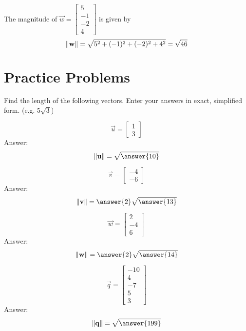 \documentclass{ximera}
\begin{document}
\begin{example}\label{ex:findnorminr4}
The magnitude of $\vec{w}=\begin{bmatrix}5\\ -1\\ -2\\ 4\end{bmatrix}$ is given by
 $$\left\lVert\mathbf{w}\right\rVert=\sqrt{5^2+(-1)^2+(-2)^2+4^2}=\sqrt{46}$$ 
\end{example}

\section*{Practice Problems}
\begin{problem}%
Find the length of the following vectors.  Enter your answers in exact, simplified form. (e.g. $5\sqrt{3}$)
\begin{problem}\label{prob:magnitude1}
 $$\vec{u}=\begin{bmatrix}1\\3\end{bmatrix}$$ 
 Answer:
 $$\norm{\vec{u}}=\sqrt{\answer{10}}$$
 \end{problem}
 
 \begin{problem}\label{prob:magnitude2}
 $$\vec{v}=\begin{bmatrix}-4\\-6\end{bmatrix}$$
 Answer:
 $$\norm{\vec{v}}=\answer{2}\sqrt{\answer{13}}$$
 \end{problem}
 
 \begin{problem}\label{prob:magnitude3}
 $$\vec{w}=\begin{bmatrix}2\\-4\\6\end{bmatrix}$$
 Answer:
 $$\norm{\vec{w}}=\answer{2}\sqrt{\answer{14}}$$
 \end{problem}
 
 \begin{problem}\label{prob:magnitude4}
 $$\vec{q}=\begin{bmatrix}-10\\ 4\\ -7\\ 5\\ 3\end{bmatrix}$$
 Answer:
 $$\norm{\vec{q}}=\sqrt{\answer{199}}$$
 \end{problem}
 \end{problem}
 
\end{document}
